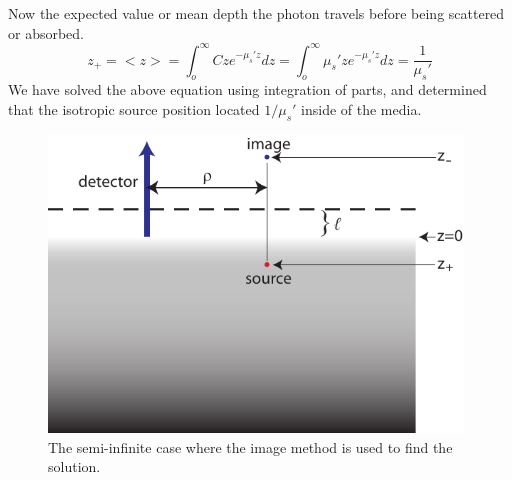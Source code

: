 \noindent
Now the expected value or mean depth the photon travels before being scattered or absorbed.
\noindent
\begin{equation}
  z_+ = <z> = \int_o^\infty Cz e^{-\mu_s'z}dz =\int_o^\infty \mu_s'z
  e^{-\mu_s'z}dz = \frac{1}{\mu_s'} 
\end{equation}
\noindent
We have solved the above equation using integration of parts, and determined that the isotropic source position located $1/ \mu_s'$ inside of the media.
\noindent
\begin{figure}[h]
\centering
\includegraphics[width=11cm]{./figures/2_Theory/semiinfinite.pdf}
\caption{The semi-infinite case where the image method is used to find the solution.}
\label{semiinf}
\end{figure}

